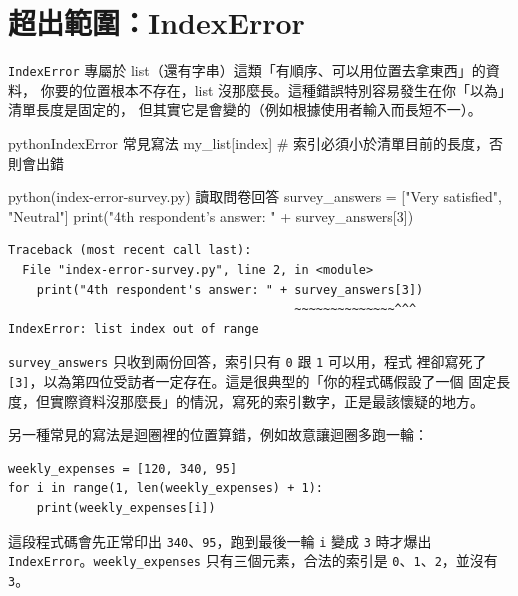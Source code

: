 
\section{超出範圍：IndexError}
\label{sec:index-error}

\texttt{IndexError} 專屬於 list（還有字串）這類「有順序、可以用位置去拿東西」的資料，
你要的位置根本不存在，list 沒那麼長。這種錯誤特別容易發生在你「以為」清單長度是固定的，
但其實它是會變的（例如根據使用者輸入而長短不一）。

\begin{code}{python}{IndexError 常見寫法}
my_list[index]     # 索引必須小於清單目前的長度，否則會出錯
\end{code}

\begin{example}{python}{(index-error-survey.py) 讀取問卷回答}
survey_answers = ["Very satisfied", "Neutral"]
print("4th respondent's answer: " + survey_answers[3])
\end{example}

\begin{verbatim}
Traceback (most recent call last):
  File "index-error-survey.py", line 2, in <module>
    print("4th respondent's answer: " + survey_answers[3])
                                        ~~~~~~~~~~~~~~^^^
IndexError: list index out of range
\end{verbatim}

\texttt{survey\_answers} 只收到兩份回答，索引只有 \texttt{0} 跟 \texttt{1} 可以用，程式
裡卻寫死了 \texttt{[3]}，以為第四位受訪者一定存在。這是很典型的「你的程式碼假設了一個
固定長度，但實際資料沒那麼長」的情況，寫死的索引數字，正是最該懷疑的地方。

另一種常見的寫法是迴圈裡的位置算錯，例如故意讓迴圈多跑一輪：

\begin{verbatim}
weekly_expenses = [120, 340, 95]
for i in range(1, len(weekly_expenses) + 1):
    print(weekly_expenses[i])
\end{verbatim}

這段程式碼會先正常印出 \texttt{340}、\texttt{95}，跑到最後一輪 \texttt{i} 變成 \texttt{3}
時才爆出 \texttt{IndexError}。\texttt{weekly\_expenses} 只有三個元素，合法的索引是
\texttt{0}、\texttt{1}、\texttt{2}，並沒有 \texttt{3}。

